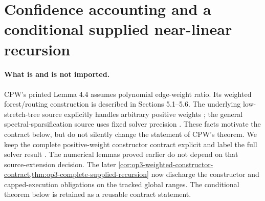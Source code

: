 \section[Conditional supplied recursion]{Confidence accounting and a conditional supplied near-linear recursion}
\label{sec:op3-supplied-recursion}

\paragraph{What is and is not imported.}
CPW's printed Lemma 4.4 assumes polynomial edge-weight ratio. Its
weighted forest/routing construction is described in Sections 5.1--5.6.
The underlying low-stretch-tree source explicitly handles arbitrary
positive weights \citep[Sections 6--7]{abraham2019petal}; the general
spectral-sparsification source uses fixed solver precision
\citep[Sections 3.4 and 4, Theorem 4.2]{koutis2015sparsification}.
These facts motivate the contract below, but do not silently change the
statement of CPW's theorem. We keep the complete positive-weight
constructor contract explicit and label the full solver result
\statusconditional. The numerical lemmas proved earlier do not depend
on that source-extension decision. The later
\cref{cor:op3-weighted-constructor-contract,thm:op3-complete-supplied-recursion}
now discharge the constructor and capped-execution obligations on the
tracked global ranges. The conditional theorem below is retained as a
reusable contract statement.

